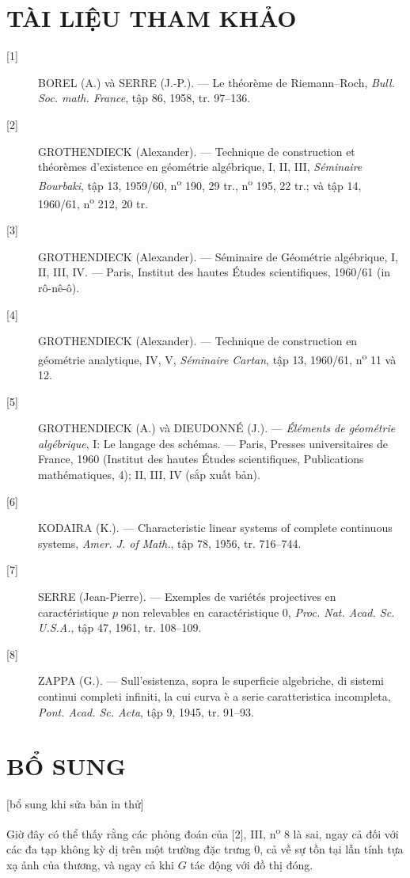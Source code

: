 \section*{TÀI LIỆU THAM KHẢO}

\begin{description}
\item[{[1]}] BOREL (A.) và SERRE (J.-P.). --- Le théorème de Riemann--Roch,
\emph{Bull. Soc. math. France}, tập 86, 1958, tr. 97--136.

\item[{[2]}] GROTHENDIECK (Alexander). --- Technique de construction et
théorèmes d'existence en géométrie algébrique, I, II, III, \emph{Séminaire
Bourbaki}, tập 13, 1959/60, n\textsuperscript{o} 190, 29 tr.,
n\textsuperscript{o} 195, 22 tr.; và tập 14, 1960/61,
n\textsuperscript{o} 212, 20 tr.

\item[{[3]}] GROTHENDIECK (Alexander). --- Séminaire de Géométrie algébrique,
I, II, III, IV. --- Paris, Institut des hautes Études scientifiques, 1960/61
(in rô-nê-ô).

\item[{[4]}] GROTHENDIECK (Alexander). --- Technique de construction en
géométrie analytique, IV, V, \emph{Séminaire Cartan}, tập 13, 1960/61,
n\textsuperscript{o} 11 và 12.

\item[{[5]}] GROTHENDIECK (A.) và DIEUDONNÉ (J.). --- \emph{Éléments de
géométrie algébrique}, I: Le langage des schémas. --- Paris, Presses
universitaires de France, 1960 (Institut des hautes Études scientifiques,
Publications mathématiques, 4); II, III, IV (sắp xuất bản).

\item[{[6]}] KODAIRA (K.). --- Characteristic linear systems of complete
continuous systems, \emph{Amer. J. of Math.}, tập 78, 1956, tr. 716--744.

\item[{[7]}] SERRE (Jean-Pierre). --- Exemples de variétés projectives en
caractéristique $p$ non relevables en caractéristique 0, \emph{Proc. Nat. Acad.
Sc. U.S.A.}, tập 47, 1961, tr. 108--109.

\item[{[8]}] ZAPPA (G.). --- Sull'esistenza, sopra le superficie algebriche, di
sistemi continui completi infiniti, la cui curva è a serie caratteristica
incompleta, \emph{Pont. Acad. Sc. Acta}, tập 9, 1945, tr. 91--93.
\end{description}

\section*{BỔ SUNG}
\begin{center}
{\small [bổ sung khi sửa bản in thử]}
\end{center}

Giờ đây có thể thấy rằng các phỏng đoán của [2], III,
n\textsuperscript{o} 8 là sai, ngay cả đối với các đa tạp không kỳ dị trên một
trường đặc trưng 0, cả về sự tồn tại lẫn tính tựa xạ ảnh của thương, và ngay cả
khi $G$ tác động với đồ thị đóng.
